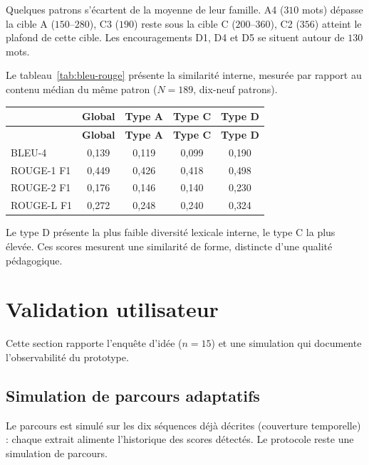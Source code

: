 Quelques patrons s'écartent de la moyenne de leur famille. A4
($310$ mots) dépasse la cible A ($150$--$280$), C3 ($190$) reste sous
la cible C ($200$--$360$), C2 ($356$) atteint le plafond de cette
cible. Les encouragements D1, D4 et D5 se situent autour de $130$ mots.

Le tableau~\ref{tab:bleu-rouge} présente la similarité interne,
mesurée par rapport au contenu médian du même patron ($N=189$,
dix-neuf patrons).

{\small
\renewcommand{\arraystretch}{1.18}
\setlength{\tabcolsep}{4pt}
\begin{xltabular}{\textwidth}{|>{\raggedright\arraybackslash}X|c|c|c|c|}
\hline
{}
 & \textbf{Global} & \textbf{Type A} & \textbf{Type C} & \textbf{Type D} \\
\hline
\endfirsthead
\hline
{}
 & \textbf{Global} & \textbf{Type A} & \textbf{Type C} & \textbf{Type D} \\
\hline
\endhead
\endfoot
\endlastfoot
BLEU-4 & 0{,}139 & 0{,}119 & 0{,}099 & 0{,}190 \\
\hline
ROUGE-1 F1 & 0{,}449 & 0{,}426 & 0{,}418 & 0{,}498 \\
\hline
ROUGE-2 F1 & 0{,}176 & 0{,}146 & 0{,}140 & 0{,}230 \\
\hline
ROUGE-L F1 & 0{,}272 & 0{,}248 & 0{,}240 & 0{,}324 \\
\hline
\end{xltabular}
\label{tab:bleu-rouge}
}

Le type D présente la plus faible diversité lexicale interne, le type C
la plus élevée. Ces scores mesurent une similarité de forme, distincte
d'une qualité pédagogique.

\section{Validation utilisateur}
\label{sec:val-utilisateur}

Cette section rapporte l'enquête d'idée ($n=15$) et une simulation qui
documente l'observabilité du prototype.

\subsection{Simulation de parcours adaptatifs}

Le parcours est simulé sur les dix séquences déjà décrites
(couverture temporelle) : chaque extrait alimente l'historique des
scores détectés. Le protocole reste une simulation de parcours.

